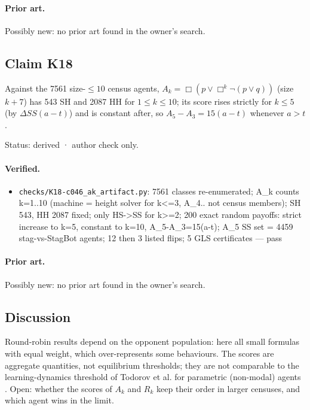 \documentclass{article}
\begin{document}
\paragraph{Prior art.} Possibly new: no prior art found in the owner's search.

\subsection*{Claim K18}

Against the 7561 size-$\le10$ census agents, $A_k=\Box(p\lor\Box^k\neg(p\lor q))$ (size $k+7$) has 543 SH and 2087 HH for $1\le k\le10$; its score rises strictly for $k\le5$ (by $\Delta SS(a-t)$) and is constant after, so $A_5-A_3=15(a-t)$ whenever $a>t$.

Status: derived · author check only.

\paragraph{Verified.}
\begin{itemize}
\item \texttt{checks/K18-c046\_ak\_artifact.py}: 7561 classes re-enumerated; A\_k counts k=1..10 (machine = height solver for k\textless{}=3, A\_4.. not census members); SH 543, HH 2087 fixed; only HS-\textgreater{}SS for k\textgreater{}=2; 200 exact random payoffs: strict increase to k=5, constant to k=10, A\_5-A\_3=15(a-t); A\_5 SS set = 4459 stag-vs-StagBot agents; 12 then 3 listed flips; 5 GLS certificates --- pass
\end{itemize}

\paragraph{Prior art.} Possibly new: no prior art found in the owner's search.

\subsection*{Discussion}

Round-robin results depend on the opponent population: here all small formulas with equal
weight, which over-represents some behaviours. The scores are aggregate quantities, not
equilibrium thresholds; they are not comparable to the learning-dynamics threshold of Todorov et
al. for parametric (non-modal) agents \cite{todorov2026parametric}. Open: whether the scores of $A_k$ and $R_k$ keep their
order in larger censuses, and which agent wins in the limit.
\end{document}
